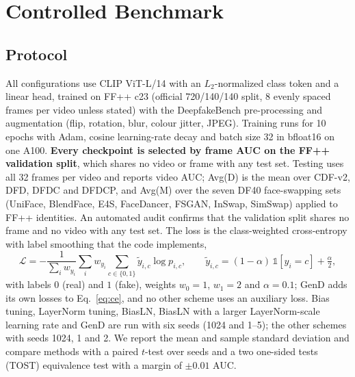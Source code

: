 \documentclass[fonts]{icst}
\begin{document}
\begin{table}[!t]
\centering
\caption{Published video AUC of detectors trained on FF++ c23, as reported by their authors (mostly Table~1 of Effort~\cite{yan2025effort}). Selection rules, frames and seeds differ between rows; the numbers are listed for reference only and are not comparable with Tables~\ref{tab:main}--\ref{tab:perdataM}. $^\dagger$: values reported by Effort.}
\label{tab:literature}
\resizebox{\textwidth}{!}{}
\end{table}

\section{Controlled Benchmark}
\label{sec:bench}

\subsection{Protocol}
All configurations use CLIP ViT-L/14 with an $L_2$-normalized class token and a linear head, trained on FF++ c23 (official 720/140/140 split, 8 evenly spaced frames per video unless stated) with the DeepfakeBench pre-processing and augmentation (flip, rotation, blur, colour jitter, JPEG). Training runs for 10 epochs with Adam, cosine learning-rate decay and batch size 32 in bfloat16 on one A100. \textbf{Every checkpoint is selected by frame AUC on the FF++ validation split}, which shares no video or frame with any test set. Testing uses all 32 frames per video and reports video AUC; Avg(D) is the mean over CDF-v2, DFD, DFDC and DFDCP, and Avg(M) over the seven DF40 face-swapping sets (UniFace, BlendFace, E4S, FaceDancer, FSGAN, InSwap, SimSwap) applied to FF++ identities. An automated audit confirms that the validation split shares no frame and no video with any test set. The loss is the class-weighted cross-entropy with label smoothing that the code implements,
\begin{equation}
\mathcal{L}=-\frac{1}{\sum_i w_{y_i}}\sum_{i} w_{y_i}\sum_{c\in\{0,1\}}\tilde{y}_{i,c}\log p_{i,c},\qquad \tilde{y}_{i,c}=(1-\alpha)\,\mathbb{1}[y_i=c]+\tfrac{\alpha}{2},
\label{eq:ce}
\end{equation}
with labels $0$ (real) and $1$ (fake), weights $w_0=1$, $w_1=2$ and $\alpha=0.1$; GenD adds its own losses to Eq.~\eqref{eq:ce}, and no other scheme uses an auxiliary loss. Bias tuning, LayerNorm tuning, BiasLN, BiasLN with a larger LayerNorm-scale learning rate and GenD are run with six seeds (1024 and 1--5); the other schemes with seeds 1024, 1 and 2. We report the mean and sample standard deviation and compare methods with a paired $t$-test over seeds and a two one-sided tests (TOST) equivalence test with a margin of $\pm0.01$ AUC.
\end{document}
